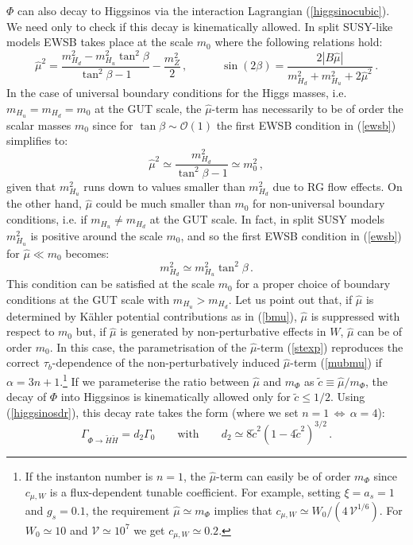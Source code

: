\documentclass[11pt,a4paper]{article}
\newcommand{\be}{\begin{equation}}
\newcommand{\ee}{\end{equation}}
\newcommand\vo{{\mathcal{V}}}
\begin{document}
$\Phi$ can also decay to Higgsinos via the interaction Lagrangian (\ref{higgsinocubic}). We need only to check if this decay is kinematically allowed. In split SUSY-like models EWSB takes place at the scale $m_0$ where the following relations hold:
\be
\hat\mu^2 = \frac{m_{H_d}^2 - m_{H_u}^2 \tan^2 \beta}{\tan^2 \beta - 1} - \frac{m_Z^2}{2}\,, \qquad \quad \sin\left(2 \beta\right) = \frac{2 |B \hat\mu|}{m_{H_d}^2 + m_{H_u}^2 + 2 \hat\mu^2}\,.
\label{ewsb}
\ee
In the case of universal boundary conditions for the Higgs masses, i.e. $m_{H_u}=m_{H_d}=m_0$ at the GUT scale, the $\hat\mu$-term has necessarily to be of order the scalar masses $m_0$ since for $\tan \beta \sim \mathcal{O}\left(1\right)$ the first EWSB condition in (\ref{ewsb}) simplifies to:
\be
\hat\mu^2 \simeq \frac{m_{H_d}^2}{\tan^2 \beta - 1} \simeq m_0^2 \,,
\label{ewsb2}
\ee
given that $m_{H_u}^2$ runs down to values smaller than $m_{H_d}^2$ due to RG flow effects. On the other hand, $\hat\mu$ could be much smaller than $m_0$ for non-universal boundary conditions, i.e. if $m_{H_u} \neq m_{H_d}$ at the GUT scale. In fact, in split SUSY models $m_{H_u}^2$ is positive around the scale $m_0$, and so the first EWSB condition in (\ref{ewsb}) for $\hat\mu \ll m_0$ becomes:
\be
m_{H_d}^2 \simeq m_{H_u}^2 \tan^2 \beta \,.
\ee
This condition can be satisfied at the scale $m_0$ for a proper choice of boundary conditions at the GUT scale with $m_{H_u}>m_{H_d}$. 
Let us point out that, if $\hat\mu$ is determined by K\"ahler potential contributions as in (\ref{bmu}), $\hat\mu$ is suppressed with respect to $m_0$ but, if $\hat\mu$ is generated by non-perturbative effects in $W$, $\hat\mu$ can be of order $m_0$. In this case, the parametrisation of the $\hat\mu$-term (\ref{stexp}) reproduces the correct $\tau_b$-dependence of the non-perturbatively induced $\hat\mu$-term (\ref{mubmu}) if $\alpha = 3 n + 1$.\footnote{If the instanton number is $n = 1$, the $\hat\mu$-term can easily be of order $m_\Phi$ since $c_{\mu,W}$ is a flux-dependent tunable coefficient. For example, setting $\xi = a_s = 1$ and $g_s = 0.1$, the requirement $\hat{\mu} \simeq m_\Phi$ implies that $c_{\mu,W} \simeq W_0/(4\,\vo^{1/6})$. For $W_0 \simeq 10$ and $\vo \simeq 10^7$ we get $c_{\mu,W} \simeq 0.2$.} If we parameterise the ratio between $\hat\mu$ and $m_{\Phi}$ as $\tilde{c} \equiv \hat\mu/m_\Phi$, the decay of $\Phi$ into Higgsinos is kinematically allowed only for $\tilde{c} \leq 1/2$. Using (\ref{higgsinosdr}), this decay rate takes the form (where we set $n = 1\,\Leftrightarrow\,\alpha = 4$):
\be
\Gamma_{\Phi \rightarrow \tilde{H} \tilde{H}} = d_2 \Gamma_0 \qquad\text{with}\qquad d_2 \simeq 8 \tilde{c}^2 \left(1 - 4 \tilde{c}^2\right)^{3/2}\,.
\label{higgsinogamma}
\ee
\end{document}
